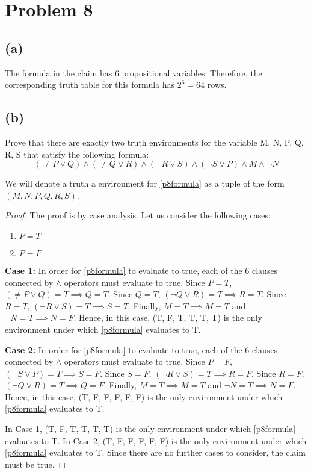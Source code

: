 \documentclass{article}
\begin{document}
\pagebreak

\section{Problem 8}
\subsection{(a)}
The formula in the claim has 6 propositional variables. Therefore, the corresponding truth table for this formula has $2^6 = 64$ rows.

\subsection{(b)}
Prove that there are exactly two truth environments for the variable M, N, P, Q, R, S that satisfy the following formula:
\begin{equation}\label{p8formula}
	(\neq P \lor Q) \land (\neq Q \lor R) \land (\neg R \lor S) \land (\neg S \lor P) \land M \land \neg N
\end{equation}

We will denote a truth a environment for \eqref{p8formula} as a tuple of the form $(M, N, P, Q, R, S)$.

\begin{proof}
	The proof is by case analysis. Let us consider the following cases:
	\begin{enumerate}
		\item $P = T$
		\item $P = F$
	\end{enumerate}

	\textbf{Case 1:}
	In order for \eqref{p8formula} to evaluate to true, each of the 6 clauses connected by $\land$ operators must evaluate to true. Since $P = T$, $(\neq P \lor Q) = T \implies Q = T$. Since $Q = T$, $(\neg Q \lor R) = T \implies R = T$. Since $R = T$, $(\neg R \lor S) = T \implies S = T$. Finally, $M = T \implies M = T$ and $\neg N = T \implies N = F$. Hence, in this case, (T, F, T, T, T, T) is the only environment under which \eqref{p8formula} evaluates to T.

	\textbf{Case 2:}
	In order for \eqref{p8formula} to evaluate to true, each of the 6 clauses connected by $\land$ operators must evaluate to true. Since $P = F$, $(\neg S \lor P) = T \implies S = F$. Since $S = F$, $(\neg R \lor S) = T \implies R = F$. Since $R = F$, $(\neg Q \lor R) = T \implies Q = F$. Finally, $M = T \implies M = T$ and $\neg N = T \implies N = F$. Hence, in this case, (T, F, F, F, F, F) is the only environment under which \eqref{p8formula} evaluates to T.

	In Case 1, (T, F, T, T, T, T) is the only environment under which \eqref{p8formula} evaluates to T. In Case 2, (T, F, F, F, F, F) is the only environment under which \eqref{p8formula} evaluates to T. Since there are no further cases to consider, the claim must be true.
\end{proof}
\end{document}
